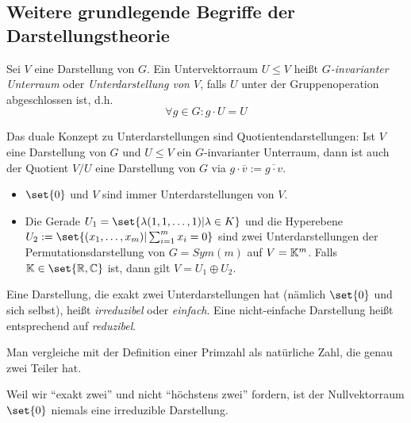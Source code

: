 \subsection{Weitere grundlegende Begriffe der Darstellungstheorie}
\begin{definition}[Unterdarstellungen]
Sei $V$ eine Darstellung von $G$. Ein Untervektorraum $U\leq V$ heißt \emph{$G$-invarianter Unterraum} oder \emph{Unterdarstellung von $V$}, falls $U$ unter der Gruppenoperation abgeschlossen ist, d.h.
\[\forall g\in G: g\cdot U = U\]
\end{definition}

\begin{lemma}[Quotienten]
Das duale Konzept zu Unterdarstellungen sind Quotientendarstellungen: Ist $V$ eine Darstellung von $G$ und $U\leq V$ ein $G$-invarianter Unterraum, dann ist auch der Quotient $V/U$ eine Darstellung von $G$ via $g\cdot\overline{v} := \overline{g\cdot v}$.
\end{lemma}

\begin{example}
\begin{itemize}
\item $\set{0}$ und $V$ sind immer Unterdarstellungen von $V$.
\item Die Gerade $U_1=\set{\lambda(1,1,\ldots,1) | \lambda\in K}$ und die Hyperebene $U_2 := \set{(x_1,\ldots,x_m) | \sum_{i=1}^m x_i = 0}$ sind zwei Unterdarstellungen der Permutationsdarstellung von $G=Sym(m)$ auf $V=\mathbb{K}^m$. Falls $\IK\in\set{\IR,\IC}$ ist, dann gilt $V=U_1\oplus U_2$.
\end{itemize}
\end{example}

\begin{definition}
Eine Darstellung, die exakt zwei Unterdarstellungen hat (nämlich $\set{0}$ und sich selbst), heißt \emph{irreduzibel} oder \emph{einfach}. Eine nicht-einfache Darstellung heißt entsprechend auf \emph{reduzibel}.
\end{definition}

\begin{remark}
Man vergleiche mit der Definition einer Primzahl als natürliche Zahl, die genau zwei Teiler hat.
\end{remark}

\begin{remark}
Weil wir \enquote{exakt zwei} und nicht \enquote{höchstens zwei} fordern, ist der Nullvektorraum $\set{0}$ niemals eine irreduzible Darstellung.
\end{remark}


